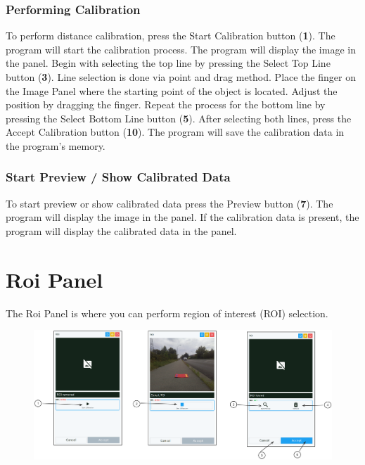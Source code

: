 \subsubsection{Performing Calibration}

To perform distance calibration, press the Start Calibration button (\textbf{1}). The program will start the calibration process. The program will display the image in the panel. Begin with selecting the top line by pressing the Select Top Line button (\textbf{3}). Line selection is done via point and drag method. Place the finger on the Image Panel where the starting point of the object is located. Adjust the position by dragging the finger. Repeat the process for the bottom line by pressing the Select Bottom Line button (\textbf{5}). After selecting both lines, press the Accept Calibration button (\textbf{10}). The program will save the calibration data in the program's memory.

\subsubsection{Start Preview / Show Calibrated Data}

To start preview or show calibrated data press the Preview button (\textbf{7}). The program will display the image in the panel. If the calibration data is present, the program will display the calibrated data in the panel.

\pagebreak
\section{Roi Panel}
\label{sec:roi-panel}

The Roi Panel is where you can perform region of interest (ROI) selection.

\begin{figure}[H]
    \centering
    \includegraphics[width=\textwidth]{texs/chapter1/image/p8.png}
\end{figure}

